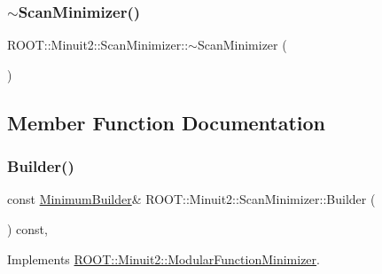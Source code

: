 \mbox{\label{classROOT_1_1Minuit2_1_1ScanMinimizer_a4c905e6b138573bf48d92cbcace158a7}} 
\subsubsection{\texorpdfstring{$\sim$ScanMinimizer()}{~ScanMinimizer()}\hspace{0.1cm}{\footnotesize\ttfamily [3/3]}}
{\footnotesize\ttfamily R\+O\+O\+T\+::\+Minuit2\+::\+Scan\+Minimizer\+::$\sim$\+Scan\+Minimizer (\begin{DoxyParamCaption}{ }\end{DoxyParamCaption})\hspace{0.3cm}{\ttfamily [inline]}}



\subsection{Member Function Documentation}
\mbox{\label{classROOT_1_1Minuit2_1_1ScanMinimizer_a6ca4b63ec20ed8dd310e02d427ef05fa}} 
\subsubsection{\texorpdfstring{Builder()}{Builder()}\hspace{0.1cm}{\footnotesize\ttfamily [1/3]}}
{\footnotesize\ttfamily const \mbox{\hyperlink{classROOT_1_1Minuit2_1_1MinimumBuilder}{Minimum\+Builder}}\& R\+O\+O\+T\+::\+Minuit2\+::\+Scan\+Minimizer\+::\+Builder (\begin{DoxyParamCaption}{ }\end{DoxyParamCaption}) const\hspace{0.3cm}{\ttfamily [inline]}, {\ttfamily [virtual]}}



Implements \mbox{\hyperlink{classROOT_1_1Minuit2_1_1ModularFunctionMinimizer_a13e98551cf14e927c61e1e34ecf8ba8b}{R\+O\+O\+T\+::\+Minuit2\+::\+Modular\+Function\+Minimizer}}.


